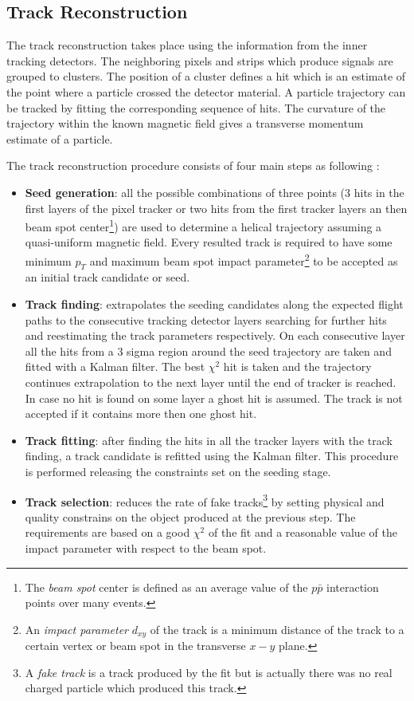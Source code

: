 \subsection{Track Reconstruction}\label{ssec:trkReco}

The track reconstruction takes place using the information from the inner tracking detectors. The neighboring pixels and strips which
produce signals are grouped to clusters. The position of a cluster defines a hit which is an estimate of the point where a particle crossed the
detector material. A particle trajectory can be tracked by fitting the corresponding sequence of hits. The curvature 
of the trajectory within the known magnetic field gives a transverse momentum estimate of a particle.

The track reconstruction procedure consists of four main steps as following \cite{Chatrchyan:2014fea}:

\begin{itemize}
 \item \textbf{Seed generation}: all the possible combinations of three points (3 hits in the first layers of the pixel tracker or
 two hits from the first tracker layers an then beam spot center\footnote{The \textit{beam spot} center is 
 defined as an average value of the $p\bar{p}$ interaction points over many events.}) are used to determine a helical trajectory 
 assuming a quasi-uniform magnetic field. Every resulted track is required to have some minimum $p_{T}$ and maximum beam spot impact 
 parameter\footnote{An \textit{impact parameter} $d_{xy}$ of the track is a minimum distance of the track to a certain vertex or 
 beam spot in the transverse $x-y$ plane.} to be accepted as an initial track candidate or seed.
 \item \textbf{Track finding}: extrapolates the seeding candidates along the expected flight paths to the consecutive tracking detector layers searching 
 for further hits and reestimating the track parameters respectively. On each consecutive layer all the hits from a 3 sigma region around the seed trajectory
 are taken and fitted with a Kalman filter\cite{Fruhwirth:1987fm}. The best $\chi^{2}$ hit is taken and the trajectory
 continues extrapolation to the next layer until the end of tracker is reached. In case no hit is found on some layer a ghost hit is assumed. The track is not
 accepted if it contains more then one ghost hit.
 \item \textbf{Track fitting}: after finding the hits in all the tracker layers with the track finding, a track candidate is refitted using the Kalman filter. 
 This procedure is performed releasing the constraints set on the seeding stage.
 \item \textbf{Track selection}: reduces the rate of fake tracks\footnote{A \textit{fake track} is a track produced by the fit but is actually there was
 no real charged particle which produced this track.} by setting physical and quality constrains on the object produced at the previous step. The requirements
 are based on a good $\chi^{2}$ of the fit and a reasonable value of the impact parameter with respect to the beam spot.
\end{itemize}

